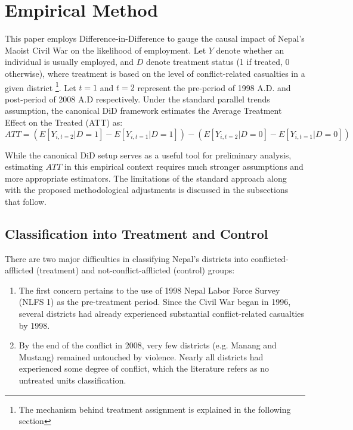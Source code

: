 \documentclass[12pt,a4paper]{article}
\begin{document}



\section{Empirical Method}
This paper employs Difference-in-Difference to gauge the causal impact of Nepal's Maoist Civil War on the likelihood of employment. Let $Y$ denote whether an individual is usually employed, and $D$ denote treatment status (1 if treated, 0 otherwise), where treatment is based on the level of conflict-related casualties in a given district \footnote{The mechanism behind treatment assignment is explained in the following section}. Let $t=1$ and $t=2$ represent the pre-period of 1998 A.D. and post-period of 2008 A.D respectively. Under the standard parallel trends assumption, the canonical DiD framework estimates the Average Treatment Effect on the Treated (ATT) as:
\begin{equation}
	ATT=(E[Y_{i,t=2}|D=1]-E[Y_{i,t=1}|D=1])-(E[Y_{i,t=2}|D=0]-E[Y_{i,t=1}|D=0])
\end{equation}

While the canonical DiD setup serves as a useful tool for preliminary analysis, estimating $ATT$ in this empirical context requires much stronger assumptions and more appropriate estimators. The limitations of the standard approach along with the proposed methodological adjustments is discussed in the subsections that follow.

\subsection{Classification into Treatment and Control}
There are two major difficulties in classifying Nepal's districts into conflicted-afflicted (treatment) and not-conflict-afflicted (control) groups:

\begin{enumerate}
	\item The first concern pertains to the use of 1998 Nepal Labor Force Survey (NLFS 1) as the pre-treatment period. Since the Civil War began in 1996, several districts had already experienced substantial conflict-related casualties by 1998.
	
	\item By the end of the conflict in 2008, very few districts (e.g. Manang and Mustang) remained untouched by violence. Nearly all districts had experienced some degree of conflict, which the literature refers as no untreated units classification.
	
\end{enumerate}
\end{document}
